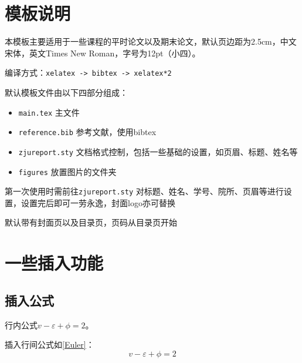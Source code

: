 \documentclass[12pt,hyperref,a4paper,UTF8]{ctexart}
\begin{document}
\cover

%
%

\thispagestyle{empty} %

\newpage
\tableofcontents

\newpage


\section{模板说明}
本模板主要适用于一些课程的平时论文以及期末论文，默认页边距为2.5cm，中文宋体，英文Times New Roman，字号为12pt（小四）。

编译方式：\verb|xelatex -> bibtex -> xelatex*2|


默认模板文件由以下四部分组成：
\begin{itemize}
    \item \texttt{main.tex} 主文件
    \item \texttt{reference.bib} 参考文献，使用bibtex
    \item \texttt{zjureport.sty} 文档格式控制，包括一些基础的设置，如页眉、标题、姓名等
    \item \texttt{figures} 放置图片的文件夹
\end{itemize}

第一次使用时需前往\texttt{zjureport.sty} 对标题、姓名、学号、院所、页眉等进行设置，设置完后即可一劳永逸，封面logo亦可替换

默认带有封面页以及目录页，页码从目录页开始

\section{一些插入功能}
\subsection{插入公式}
行内公式$v-\varepsilon+\phi=2$。

插入行间公式如\autoref{Euler}：
\begin{equation}
    v-\varepsilon+\phi=2
    \label{Euler}
\end{equation}
\end{document}
